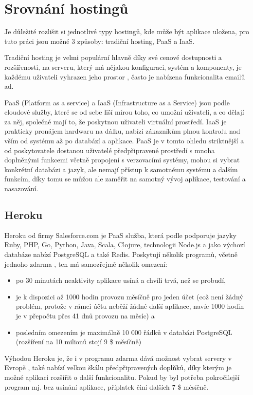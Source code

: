     
    \section{Srovnání hostingů}
    Je důležité rozlišit si jednotlivé typy hostingů, kde může být aplikace uložena, pro tuto práci jsou možné 3 způsoby: tradiční hosting, PaaS a IaaS.
    
    Tradiční hosting je velmi populární hlavně díky své cenové dostupnosti a rozšířenosti, na serveru, který má nějakou konfiguraci, systém a komponenty, je každému uživateli vyhrazen jeho prostor \cite{hosting2}, často je nabízena funkcionalita emailů ad.
    
    PaaS (Platform as a service) a IaaS (Infrastructure as a Service) jsou podle \cite{hosting1} cloudové služby, které se od sebe liší mírou toho, co umožní uživateli, a co dělají za něj, společné mají to, že poskytnou uživateli virtuální prostředí. IaaS je prakticky pronájem hardwaru na dálku, nabízí zákazníkům plnou kontrolu nad vším od systému až po databází a aplikace. PaaS je v tomto ohledu striktnější a od poskytovatele dostanou uživatelé předpřipravené prostředí s mnoha doplněnými funkcemi včetně propojení s verzovacími systémy, mohou si vybrat konkrétní databázi a jazyk, ale nemají přístup k samotnému systému a dalším funkcím, díky tomu se můžou ale zaměřit na samotný vývoj aplikace, testování a nasazování.
    
        \subsection{Heroku}\label{heroku}
        Heroku od firmy Salesforce.com je PaaS služba, která podle \cite{heroku1} podporuje jazyky Ruby, PHP, Go, Python, Java, Scala, Clojure, technologii Node.js a jako výchozí databáze nabízí PostgreSQL a také Redis. Poskytují několik programů, včetně jednoho zdarma \cite{heroku2}, ten má samozřejmě několik omezení:
            \begin{itemize}
                \item po 30 minutách neaktivity aplikace usíná a chvíli trvá, než se probudí,
                \item je k dispozici až 1000 hodin provozu měsíčně pro jeden účet (což není žádný problém, protože v rámci účtu neběží žádné další aplikace, navíc 1000 hodin je v přepočtu přes 41 dnů provozu na měsíc) a
                \item posledním omezením je maximálně 10 000 řádků v databázi PostgreSQL (rozšíření na 10 milionů stojí 9 \$ měsíčně)
            \end{itemize}
        Výhodou Heroku je, že i v programu zdarma dává možnost vybrat servery v Evropě \cite{heroku3}, také nabízí velkou škálu předpřipravených doplňků, díky kterým je možné aplikaci rozšířit o další funkcionalitu. Pokud by byl potřeba pokročilejší program mj. bez usínání aplikace, příplatek činí dalších 7 \$ měsíčně.
        
